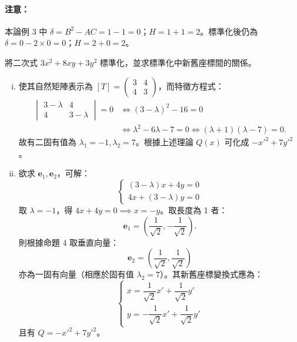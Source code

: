\paragraph{注意：}
本論例 3 中 $\delta = B^2 - AC = 1 - 1 = 0$；$H = 1 + 1 = 2$。標準化後仍為 $\delta = 0 - 2 \times 0 = 0$；$H = 2 + 0 = 2$。

\begin{discussion}
將二次式 $3x^2 + 8xy + 3y^2$ 標準化，並求標準化中新舊座標間的關係。
\end{discussion}

\begin{solution}
\begin{enumerate}[(i)]
  \item 使其自然矩陣表示為 $[T] = \begin{pmatrix} 3 & 4 \\ 4 & 3 \end{pmatrix}$，而特徵方程式：
  \begin{align*}
  \begin{vmatrix} 3 - \lambda & 4 \\ 4 & 3 - \lambda \end{vmatrix} = 0
  &\iff (3 - \lambda)^2 - 16 = 0 \\
  &\iff \lambda^2 - 6\lambda - 7 = 0 \iff (\lambda + 1)(\lambda - 7) = 0.
  \end{align*}
  故有二固有值為 $\lambda_1 = -1, \lambda_2 = 7$。根據上述理論 $Q(x)$ 可化成 $-{x'}^2 + 7{y'}^2$。
  
  \item 欲求 $\mathbf{e}_1, \mathbf{e}_2$，可解：
  \[
  \begin{cases}
  (3 - \lambda)x + 4y = 0 \\
  4x + (3 - \lambda)y = 0
  \end{cases}
  \]
  取 $\lambda = -1$，得 $4x + 4y = 0 \implies x = -y$。取長度為 1 者：
  \[
  \mathbf{e}_1 = \left( \frac{1}{\sqrt{2}}, -\frac{1}{\sqrt{2}} \right).
  \]
  則根據命題 4 取垂直向量：
  \[
  \mathbf{e}_2 = \left( \frac{1}{\sqrt{2}}, \frac{1}{\sqrt{2}} \right)
  \]
  亦為一固有向量（相應於固有值 $\lambda_2 = 7$）。其新舊座標變換式應為：
  \[
  \begin{cases}
  x = \dfrac{1}{\sqrt{2}}x' + \dfrac{1}{\sqrt{2}}y' \\[0.5em]
  y = -\dfrac{1}{\sqrt{2}}x' + \dfrac{1}{\sqrt{2}}y'
  \end{cases}
  \]
  且有 $Q = -{x'}^2 + 7{y'}^2$。
\end{enumerate}
\end{solution}

